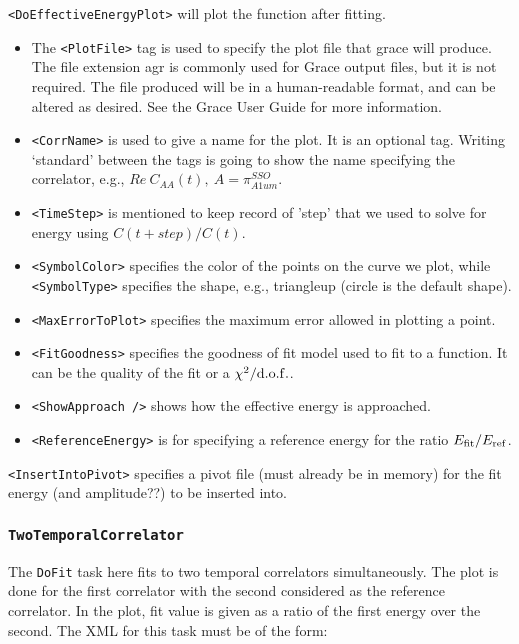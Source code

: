 \documentclass[12pt]{article}
\newcommand{\vb}{\texttt}
\begin{document}
\vb{<DoEffectiveEnergyPlot>} will plot the function after fitting.

\begin{itemize}
\item The \vb{<PlotFile>} tag is used to specify the plot file that grace will produce. The file
  extension agr is commonly used for Grace output files, but it is not required. The file produced
  will be in a human-readable format, and can be altered as desired. See the Grace User Guide
  for more information.

\item \vb{<CorrName>} is used to give a name for the plot. It is an optional tag. Writing `standard'
  between the tags is going to show the name specifying the correlator,
  e.g., $Re \: C_{AA}(t),\: A = \pi_{A1um}^{SSO}$.

\item \vb{<TimeStep>} is mentioned to keep record of 'step' that we used to solve for energy
  using $C(t+step)/C(t)$.

\item \vb{<SymbolColor>} specifies the color of the points on the curve we plot, while \vb{<SymbolType>}
  specifies the shape, e.g., triangleup (circle is the default shape).

\item \vb{<MaxErrorToPlot>} specifies the maximum error allowed in plotting a point.

\item \vb{<FitGoodness>} specifies the goodness of fit model used to fit to a function. It can be the
  quality of the fit or a $\chi^2/{\rm d.o.f.}$.

\item \vb{<ShowApproach />} shows how the effective energy is approached.

\item \vb{<ReferenceEnergy>} is for specifying a reference energy for the ratio $E_{\rm fit}/E_{\rm ref}$.
\end{itemize}

\vb{<InsertIntoPivot>} specifies a pivot file (must already be in memory) for the fit energy (and amplitude??)
to be inserted into.

\subsubsection{\vb{TwoTemporalCorrelator}}
The \vb{DoFit} task here fits to two temporal correlators simultaneously. The plot is done for the
first correlator with the second considered as the reference correlator. In the plot, fit value is given
as a ratio of the first energy over the second.
The XML for this task must be of the form:
\end{document}
